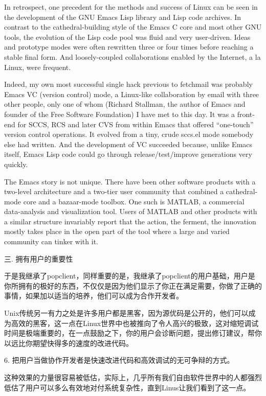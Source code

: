 \documentclass[a4paper,12pt,UTF8,twoside]{ctexbook}
\begin{document}
In retrospect, one precedent for the methods and success of Linux can be seen in the development of the GNU Emacs Lisp library and Lisp code archives. In contrast to the cathedral-building style of the Emacs C core and most other GNU tools, the evolution of the Lisp code pool was fluid and very user-driven. Ideas and prototype modes were often rewritten three or four times before reaching a stable final form. And loosely-coupled collaborations enabled by the Internet, a la Linux, were frequent.

Indeed, my own most successful single hack previous to fetchmail was probably Emacs VC (version control) mode, a Linux-like collaboration by email with three other people, only one of whom (Richard Stallman, the author of Emacs and founder of the Free Software Foundation) I have met to this day. It was a front-end for SCCS, RCS and later CVS from within Emacs that offered ``one-touch'' version control operations. It evolved from a tiny, crude sccs.el mode somebody else had written. And the development of VC succeeded because, unlike Emacs itself, Emacs Lisp code could go through release/test/improve generations very quickly.

The Emacs story is not unique. There have been other software products with a two-level architecture and a two-tier user community that combined a cathedral-mode core and a bazaar-mode toolbox. One such is MATLAB, a commercial data-analysis and visualization tool. Users of MATLAB and other products with a similar structure invariably report that the action, the ferment, the innovation mostly takes place in the open part of the tool where a large and varied community can tinker with it.

三. 拥有用户的重要性


于是我继承了popclient，同样重要的是，我继承了popclient的用户基础，用户是你所拥有的极好的东西，不仅仅是因为他们显示了你正在满足需要，你做了正确的事情，如果加以适当的培养，他们可以成为合作开发者。


Unix传统另一有力之处是许多用户都是黑客，因为源优码是公开的，他们可以成为高效的黑客，这一点在Linux世界中也被推向了令人高兴的极致，这对缩短调试时间是极端重要的，在一点鼓励之下，你的用户会诊断问题，提出修订建议，帮你以远比你期望快得多的速度的改进代码。


6. 把用户当做协作开发者是快速改进代码和高效调试的无可争辩的方式。


这种效果的力量很容易被低估，实际上，几乎所有我们自由软件世界中的人都强烈低估了用户可以多么有效地对付系统复杂性，直到Linus让我们看到了这一点。
\end{document}
